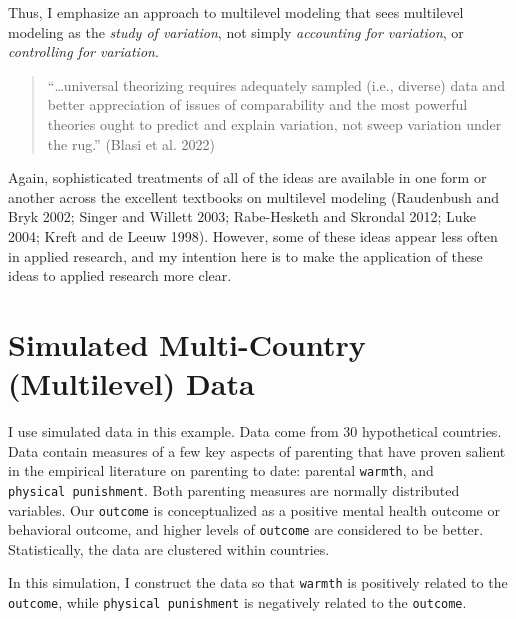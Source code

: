 \documentclass[
  letterpaper,
  DIV=11,
  numbers=noendperiod]{scrreprt}
\begin{document}
Thus, I emphasize an approach to multilevel modeling that sees
multilevel modeling as the \emph{study of variation}, not simply
\emph{accounting for variation}, or \emph{controlling for variation}.

\begin{quote}
``\ldots universal theorizing requires adequately sampled (i.e.,
diverse) data and better appreciation of issues of comparability and the
most powerful theories ought to predict and explain variation, not sweep
variation under the rug.'' (Blasi et al. 2022)
\end{quote}

Again, sophisticated treatments of all of the ideas are available in one
form or another across the excellent textbooks on multilevel modeling
(Raudenbush and Bryk 2002; Singer and Willett 2003; Rabe-Hesketh and
Skrondal 2012; Luke 2004; Kreft and de Leeuw 1998). However, some of
these ideas appear less often in applied research, and my intention here
is to make the application of these ideas to applied research more
clear.


\hypertarget{simulated-multi-country-multilevel-data}{%
\chapter{Simulated Multi-Country (Multilevel)
Data}\label{simulated-multi-country-multilevel-data}}

I use simulated data in this example. Data come from 30 hypothetical
countries. Data contain measures of a few key aspects of parenting that
have proven salient in the empirical literature on parenting to date:
parental \texttt{warmth}, and \texttt{physical\ punishment}. Both
parenting measures are normally distributed variables. Our
\texttt{outcome} is conceptualized as a positive mental health outcome
or behavioral outcome, and higher levels of \texttt{outcome} are
considered to be better. Statistically, the data are clustered within
countries.

In this simulation, I construct the data so that \texttt{warmth} is
positively related to the \texttt{outcome}, while
\texttt{physical\ punishment} is negatively related to the
\texttt{outcome}.
\end{document}
